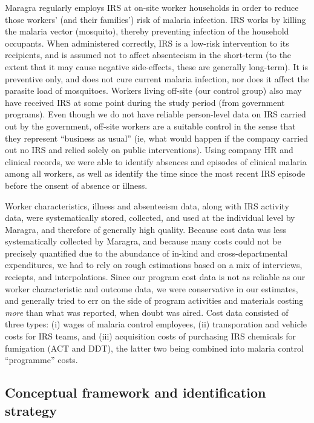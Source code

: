 \documentclass[]{article}
\begin{document}
Maragra regularly employs IRS at on-site worker households in order to
reduce those workers' (and their families') risk of malaria infection.
IRS works by killing the malaria vector (mosquito), thereby preventing
infection of the household occupants. When administered correctly, IRS
is a low-risk intervention to its recipients, and is assumed not to
affect absenteeism in the short-term (to the extent that it may cause
negative side-effects, these are generally long-term). It is preventive
only, and does not cure current malaria infection, nor does it affect
the parasite load of mosquitoes. Workers living off-site (our control
group) also may have received IRS at some point during the study period
(from government programs). Even though we do not have reliable
person-level data on IRS carried out by the government, off-site workers
are a suitable control in the sense that they represent ``business as
usual'' (ie, what would happen if the company carried out no IRS and
relied solely on public interventions). Using company HR and clinical
records, we were able to identify absences and episodes of clinical
malaria among all workers, as well as identify the time since the most
recent IRS episode before the onsent of absence or illness.

Worker characteristics, illness and absenteeism data, along with IRS
activity data, were systematically stored, collected, and used at the
individual level by Maragra, and therefore of generally high quality.
Because cost data was less systematically collected by Maragra, and
because many costs could not be precisely quantified due to the
abundance of in-kind and cross-departmental expenditures, we had to rely
on rough estimations based on a mix of interviews, reciepts, and
interpolations. Since our program cost data is not as reliable as our
worker characteristic and outcome data, we were conservative in our
estimates, and generally tried to err on the side of program activities
and materials costing \emph{more} than what was reported, when doubt was
aired. Cost data consisted of three types: (i) wages of malaria control
employees, (ii) transporation and vehicle costs for IRS teams, and (iii)
acquisition costs of purchasing IRS chemicals for fumigation (ACT and
DDT), the latter two being combined into malaria control ``programme''
costs.

\subsection{Conceptual framework and identification
strategy}\label{conceptual-framework-and-identification-strategy}
\end{document}
